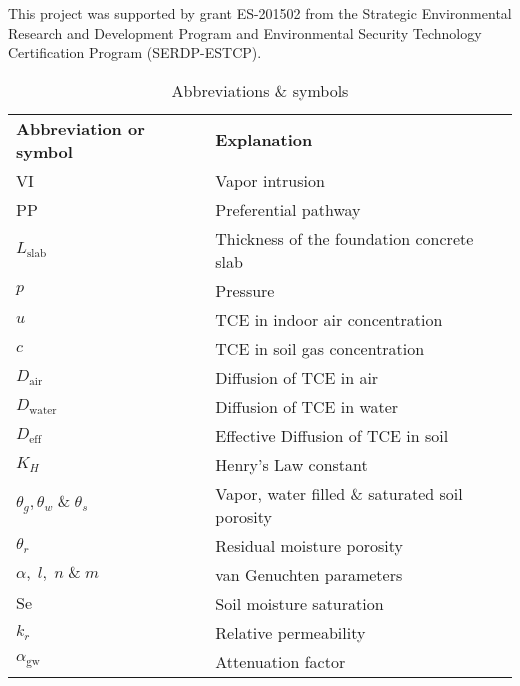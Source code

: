 \documentclass[journal=esthag,manuscript=article]{achemso}
\begin{document}
\begin{acknowledgement}
This project was supported by grant ES-201502 from the Strategic Environmental Research and Development Program and Environmental Security Technology Certification Program (SERDP-ESTCP).
\end{acknowledgement}

\begin{table}[htb!]
  \caption{Abbreviations \& symbols}
  \begin{tabular}{l l}
  \toprule
  \textbf{Abbreviation or symbol}     & \textbf{Explanation} \\
  VI                                  & Vapor intrusion \\
  PP                                  & Preferential pathway \\
  $L_\mathrm{slab}$                   & Thickness of the foundation concrete slab \\
  $p$                                 & Pressure \\
  $u$                                 & TCE in indoor air concentration \\
  $c$                                 & TCE in soil gas concentration \\
  $D_\mathrm{air}$                    & Diffusion of TCE in air \\
  $D_\mathrm{water}$                  & Diffusion of TCE in water \\
  $D_\mathrm{eff}$                    & Effective Diffusion of TCE in soil \\
  $K_H$                               & Henry's Law constant \\
  $\theta_g, \theta_w\;\&\;\theta_s$  & Vapor, water filled \& saturated soil porosity \\
  $\theta_r$                          & Residual moisture porosity \\
  $\alpha,\; l,\; n\;\&\; m$          & van Genuchten parameters \\
  $\mathrm{Se}$                       & Soil moisture saturation \\
  $k_r$                               & Relative permeability \\
  $\alpha_\mathrm{gw}$                & Attenuation factor \\
  \bottomrule
  \end{tabular}
\end{table}


\end{document}
